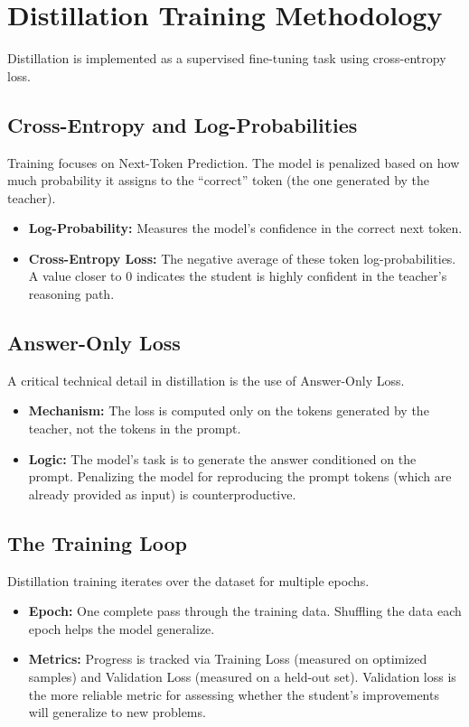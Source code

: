 \section{Distillation Training Methodology}
\label{sec:distillation-training-methodology}

Distillation is implemented as a supervised fine-tuning task using cross-entropy loss.

\subsection{Cross-Entropy and Log-Probabilities}

Training focuses on Next-Token Prediction. The model is penalized based on how much probability it assigns to the ``correct'' token (the one generated by the teacher).

\begin{itemize}
    \item \textbf{Log-Probability:} Measures the model's confidence in the correct next token.
    \item \textbf{Cross-Entropy Loss:} The negative average of these token log-probabilities. A value closer to 0 indicates the student is highly confident in the teacher's reasoning path.
\end{itemize}

\subsection{Answer-Only Loss}

A critical technical detail in distillation is the use of Answer-Only Loss.

\begin{itemize}
    \item \textbf{Mechanism:} The loss is computed only on the tokens generated by the teacher, not the tokens in the prompt.
    \item \textbf{Logic:} The model's task is to generate the answer conditioned on the prompt. Penalizing the model for reproducing the prompt tokens (which are already provided as input) is counterproductive.
\end{itemize}

\subsection{The Training Loop}

Distillation training iterates over the dataset for multiple epochs.

\begin{itemize}
    \item \textbf{Epoch:} One complete pass through the training data. Shuffling the data each epoch helps the model generalize.
    \item \textbf{Metrics:} Progress is tracked via Training Loss (measured on optimized samples) and Validation Loss (measured on a held-out set). Validation loss is the more reliable metric for assessing whether the student's improvements will generalize to new problems.
\end{itemize}
